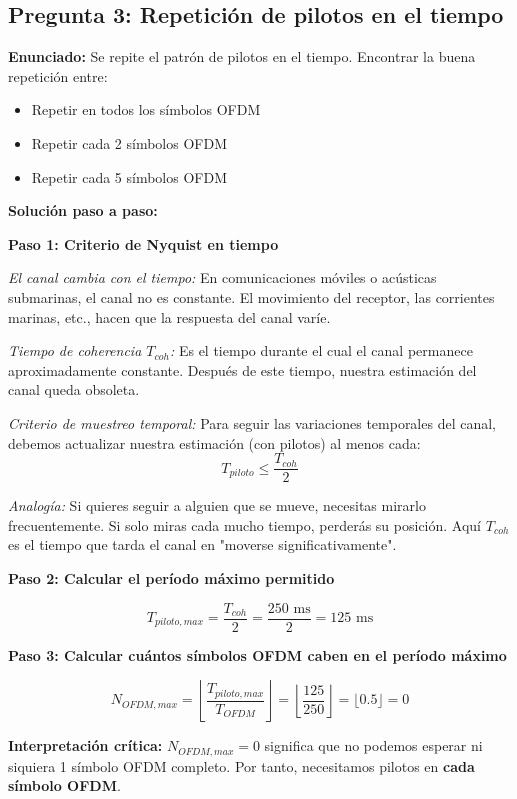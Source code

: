 \documentclass[11pt,a4paper]{article}
\begin{document}
\subsection*{Pregunta 3: Repetición de pilotos en el tiempo}

\textbf{Enunciado:} Se repite el patrón de pilotos en el tiempo. Encontrar la buena repetición entre:

\begin{itemize}
    \item[(a)] Repetir en todos los símbolos OFDM
    \item[(b)] Repetir cada 2 símbolos OFDM
    \item[(c)] Repetir cada 5 símbolos OFDM
\end{itemize}

\vspace{0.3cm}
\textbf{Solución paso a paso:}

\textbf{Paso 1: Criterio de Nyquist en tiempo}

\textit{El canal cambia con el tiempo:} En comunicaciones móviles o acústicas submarinas, el canal no es constante. El movimiento del receptor, las corrientes marinas, etc., hacen que la respuesta del canal varíe.

\textit{Tiempo de coherencia $T_{coh}$:} Es el tiempo durante el cual el canal permanece aproximadamente constante. Después de este tiempo, nuestra estimación del canal queda obsoleta.

\textit{Criterio de muestreo temporal:} Para seguir las variaciones temporales del canal, debemos actualizar nuestra estimación (con pilotos) al menos cada:
\[
T_{piloto} \leq \frac{T_{coh}}{2}
\]

\textit{Analogía:} Si quieres seguir a alguien que se mueve, necesitas mirarlo frecuentemente. Si solo miras cada mucho tiempo, perderás su posición. Aquí $T_{coh}$ es el tiempo que tarda el canal en "moverse significativamente".

\textbf{Paso 2: Calcular el período máximo permitido}

\[
T_{piloto,max} = \frac{T_{coh}}{2} = \frac{250 \text{ ms}}{2} = 125 \text{ ms}
\]

\textbf{Paso 3: Calcular cuántos símbolos OFDM caben en el período máximo}

\[
N_{OFDM,max} = \left\lfloor \frac{T_{piloto,max}}{T_{OFDM}} \right\rfloor = \left\lfloor \frac{125}{250} \right\rfloor = \lfloor 0.5 \rfloor = 0
\]

\textbf{Interpretación crítica:} $N_{OFDM,max} = 0$ significa que no podemos esperar ni siquiera 1 símbolo OFDM completo. Por tanto, necesitamos pilotos en \textbf{cada símbolo OFDM}.
\end{document}
